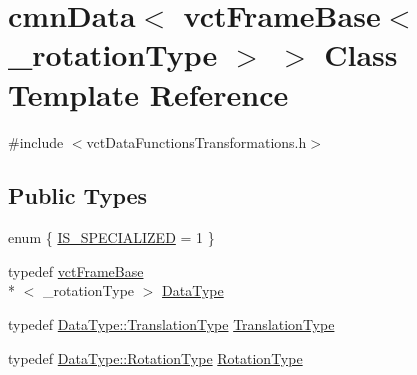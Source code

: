 \hypertarget{classcmn_data_3_01vct_frame_base_3_01__rotation_type_01_4_01_4}{\section{cmn\-Data$<$ vct\-Frame\-Base$<$ \-\_\-rotation\-Type $>$ $>$ Class Template Reference}
\label{classcmn_data_3_01vct_frame_base_3_01__rotation_type_01_4_01_4}
}


{\ttfamily \#include $<$vct\-Data\-Functions\-Transformations.\-h$>$}

\subsection*{Public Types}
\begin{DoxyCompactItemize}
\item 
enum \{ \hyperlink{classcmn_data_3_01vct_frame_base_3_01__rotation_type_01_4_01_4_ac5722a14087e99c91e2f4c2ef013c9e9addac037ede5fd10792d3ec714b36afb3}{I\-S\-\_\-\-S\-P\-E\-C\-I\-A\-L\-I\-Z\-E\-D} = 1
 \}
\item 
typedef \hyperlink{classvct_frame_base}{vct\-Frame\-Base}\\*
$<$ \-\_\-rotation\-Type $>$ \hyperlink{classcmn_data_3_01vct_frame_base_3_01__rotation_type_01_4_01_4_a6d3becc05b41db88283c842177d23bea}{Data\-Type}
\item 
typedef \hyperlink{classvct_frame_base_a4c397a93b65f0c38e75e99ff3a659c23}{Data\-Type\-::\-Translation\-Type} \hyperlink{classcmn_data_3_01vct_frame_base_3_01__rotation_type_01_4_01_4_a1fc56c85e3cdf6618625668e4c95950f}{Translation\-Type}
\item 
typedef \hyperlink{classvct_frame_base_a02e4eaad478400dd1d81e772caf3b01b}{Data\-Type\-::\-Rotation\-Type} \hyperlink{classcmn_data_3_01vct_frame_base_3_01__rotation_type_01_4_01_4_a8757351740a52df6d2b5be5e04ba0b0b}{Rotation\-Type}
\end{DoxyCompactItemize}
